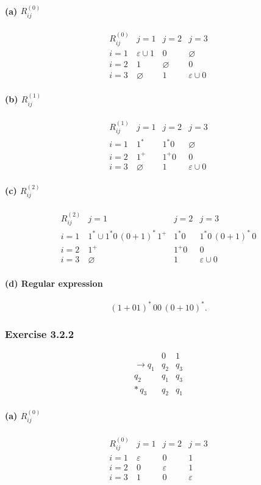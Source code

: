\documentclass{article}
\theoremstyle{theorem}
\theoremstyle{definition}
\theoremstyle{remark}
\begin{document}
\paragraph{(a) \(R_{ij}^{(0)}\)}
\[
\begin{array}{c|ccc}
R_{ij}^{(0)} & j=1 & j=2 & j=3\\\hline
i=1 & \varepsilon\cup1 & 0 & \varnothing\\
i=2 & 1 & \varnothing & 0\\
i=3 & \varnothing & 1 & \varepsilon\cup0
\end{array}
\]
\paragraph{(b) \(R_{ij}^{(1)}\)}
\[
\begin{array}{c|ccc}
R_{ij}^{(1)} & j=1 & j=2 & j=3\\\hline
i=1 & 1^* & 1^*0 & \varnothing\\
i=2 & 1^+ & 1^+0 & 0\\
i=3 & \varnothing & 1 & \varepsilon\cup0
\end{array}
\]
\paragraph{(c) \(R_{ij}^{(2)}\)}
\[
\begin{array}{c|ccc}
R_{ij}^{(2)} & j=1 & j=2 & j=3\\\hline
i=1 & 1^*\cup1^*0\,(0+1)^*\,1^+ 
      & 1^*0 
      & 1^*0\,(0+1)^*\,0\\
i=2 & 1^+ & 1^+0 & 0\\
i=3 & \varnothing & 1 & \varepsilon\cup0
\end{array}
\]
\paragraph{(d) Regular expression}
\[
(1 + 01)^*\,00\,(0 + 10)^*.
\]

\subsubsection*{Exercise 3.2.2}
\[
\begin{array}{c|cc}
     &0&1\\\hline
\to q_1 & q_2 & q_3\\
      q_2 & q_1 & q_3\\
*\,q_3 & q_2 & q_1
\end{array}
\]
\paragraph{(a) \(R_{ij}^{(0)}\)}
\[
\begin{array}{c|ccc}
R_{ij}^{(0)} & j=1 & j=2 & j=3\\\hline
i=1 & \varepsilon & 0 & 1\\
i=2 & 0 & \varepsilon & 1\\
i=3 & 1 & 0 & \varepsilon
\end{array}
\]
\end{document}
